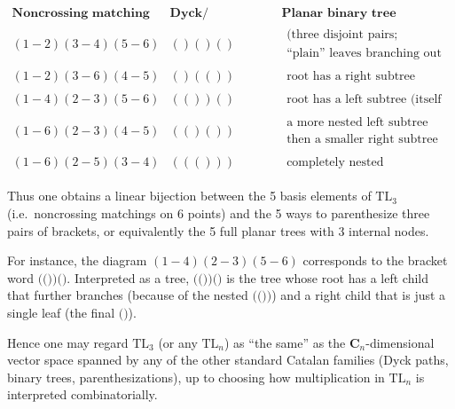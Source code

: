 \documentclass[12p]{article}
\newcounter{answercounter}
\newenvironment{answer}[1][]
{\refstepcounter{answercounter}%
\begin{tcolorbox}[
    title=Answer \theanswercounter: #1,
    colback=white, %
    colframe=gray,
    coltext=black, %
    fonttitle=\bfseries\normalsize,
    top=2mm,
    bottom=2mm,
    enlarge top initially by=5mm
]
\small
}
{\end{tcolorbox}}
\begin{document}
\begin{answer}[by openai/o1 (generated in 1 minutes and 4 seconds.)]
\[
\begin{array}{c|c|c}
\textbf{Noncrossing matching} 
& \textbf{Dyck/parentheses word} 
& \textbf{Planar binary tree}\\[6pt]
\hline
(1\!-\!2)(3\!-\!4)(5\!-\!6)
& ()()()
& 
\begin{array}{c}
\text{(three disjoint pairs; corresponds to three}\\
\text{“plain” leaves branching out from the root)}
\end{array}
\\[8pt]
(1\!-\!2)(3\!-\!6)(4\!-\!5)
& ()(())
& \begin{array}{c}
\text{root has a right subtree holding two internal nodes}
\end{array}
\\[8pt]
(1\!-\!4)(2\!-\!3)(5\!-\!6)
& (())()
& \begin{array}{c}
\text{root has a left subtree (itself branching) and a right leaf}
\end{array}
\\[8pt]
(1\!-\!6)(2\!-\!3)(4\!-\!5)
& (()())
& \begin{array}{c}
\text{a more nested left subtree with a small subtree inside,}\\
\text{then a smaller right subtree}
\end{array}
\\[8pt]
(1\!-\!6)(2\!-\!5)(3\!-\!4)
& ((()))
& \begin{array}{c}
\text{completely nested parentheses (fully left-leaning tree)}
\end{array}
\end{array}
\]

Thus one obtains a linear bijection between the 5 basis elements of \(\mathrm{TL}_3\) (i.e.\ noncrossing matchings on 6 points) and the 5 ways to parenthesize three pairs of brackets, or equivalently the 5 full planar trees with 3 internal nodes.  

For instance, the diagram \((1\!-\!4)(2\!-\!3)(5\!-\!6)\) corresponds to the bracket word \(\texttt{(())()}\).  Interpreted as a tree, \(\texttt{(())()}\) is the tree whose root has a left child that further branches (because of the nested \(\texttt{(())}\)) and a right child that is just a single leaf (the final \(\texttt{()}\)).  

Hence one may regard \(\mathrm{TL}_3\) (or any \(\mathrm{TL}_n\)) as ``the same'' as the \(\mathbf{C}_n\)-dimensional vector space spanned by any of the other standard Catalan families (Dyck paths, binary trees, parenthesizations), up to choosing how multiplication in \(\mathrm{TL}_n\) is interpreted combinatorially.
\end{answer}
\end{document}
